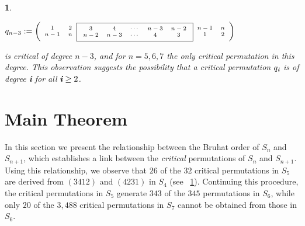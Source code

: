 \documentclass[a4 paper,12pt]{article}
\newtheorem{numeris}{}[section]
\begin{document}
\begin{numeris}
\begin{center}
$q_{n-3}:=\begin{scriptsize} \left(\begin{array}{cc}
	1 &2 \\
	n-1 & n 
\end{array}
\framebox{$
\begin{array}{ccccc}
	 3 & 4 & \cdots & n-3 & n-2 \\
	 n-2 & n-3& \cdots &  4 &  3  
\end{array}$}\begin{array}{cc}
	n-1 & n \\
	 1 & 2 
\end{array}
\right)\end{scriptsize}$ 
\end{center}
 is   critical  of degree $n-3$, and for $n=5,6,7$  the only critical permutation in this degree. This observation suggests the possibility that a critical permutation $q_{\textit{\textbf{i}}}$ is  of degree \textit{\textbf{i}}  for all $\textit{\textbf{i}}\geq 2$.
\label{critical_example}
\end{numeris}




\section{Main Theorem}
\begin{small}
In this section we present the relationship between the Bruhat order of $S_n$ and $S_{n+1}$, which establishes a link between the   \textit{critical} permutations of $S_{n}$ and  $S_{n+1}$. Using this relationship, we observe that $26$ of the $32$ critical permutations in $S_5$ are derived from  $(3412)$ and $(4231)$ in $S_4$ (see ~\ref{critical_example}). Continuing this procedure, the critical permutations in $S_5$ generate $343$ of the $345$  permutations in $S_6$, while only $20$ of the $3,488$ critical permutations in $S_7$ cannot be obtained from those in  $S_6$.
\end{small}
\end{document}
